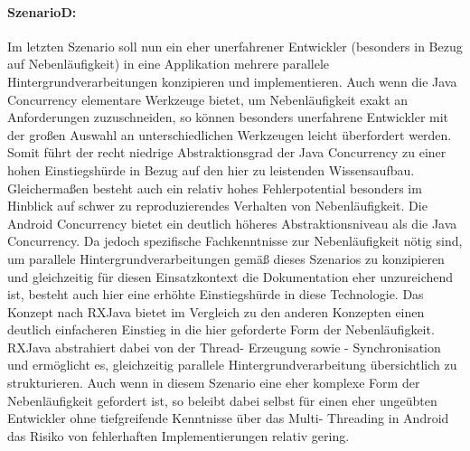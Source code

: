 \documentclass[12pt,oneside,a4paper,bibtotoc,liststotoc]{scrreprt}
\begin{document}
\paragraph{SzenarioD:}
Im letzten Szenario soll nun ein eher unerfahrener Entwickler (besonders in Bezug auf Nebenläufigkeit) in eine Applikation mehrere parallele Hintergrundverarbeitungen konzipieren und implementieren. Auch wenn die Java Concurrency elementare Werkzeuge bietet, um Nebenläufigkeit exakt an Anforderungen zuzuschneiden, so können besonders unerfahrene Entwickler mit der großen Auswahl an unterschiedlichen Werkzeugen leicht überfordert werden.  Somit führt der recht niedrige Abstraktionsgrad der Java Concurrency zu einer hohen Einstiegshürde in Bezug auf den hier zu leistenden Wissensaufbau. Gleichermaßen besteht auch ein relativ hohes Fehlerpotential besonders im Hinblick auf schwer zu reproduzierendes Verhalten von Nebenläufigkeit.
Die Android Concurrency bietet ein deutlich höheres Abstraktionsniveau als die Java Concurrency. Da jedoch spezifische Fachkenntnisse zur Nebenläufigkeit nötig sind, um parallele Hintergrundverarbeitungen gemäß dieses Szenarios zu konzipieren und gleichzeitig für diesen Einsatzkontext die Dokumentation eher unzureichend ist, besteht auch hier eine erhöhte Einstiegshürde in diese Technologie.
Das Konzept nach RXJava bietet im Vergleich zu den anderen Konzepten einen deutlich einfacheren Einstieg in die hier geforderte Form der Nebenläufigkeit. RXJava abstrahiert dabei von der Thread- Erzeugung sowie - Synchronisation und ermöglicht es, gleichzeitig parallele Hintergrundverarbeitung übersichtlich zu strukturieren. Auch wenn in diesem Szenario eine eher komplexe Form der Nebenläufigkeit gefordert ist, so beleibt dabei selbst für einen eher ungeübten Entwickler ohne tiefgreifende Kenntnisse über das Multi- Threading in Android das Risiko von fehlerhaften Implementierungen relativ gering.\newline
\end{document}
